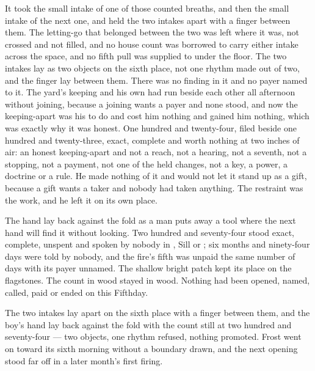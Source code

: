 It took the small intake of one of those counted breaths, and then the small intake of the next one, and held the two intakes apart with a finger between them. The letting-go that belonged between the two was left where it was, not crossed and not filled, and no house count was borrowed to carry either intake across the space, and no fifth pull was supplied to  under the floor. The two intakes lay as two objects on the sixth place, not one rhythm made out of two, and the finger lay between them. There was no finding in it and no payer named to it. The yard's keeping and his own had run beside each other all afternoon without joining, because a joining wants a payer and none stood, and now the keeping-apart was his to do and cost him nothing and gained him nothing, which was exactly why it was honest. One hundred and twenty-four, filed beside one hundred and twenty-three, exact, complete and worth nothing at two inches of air: an honest keeping-apart and not a reach, not a hearing, not a seventh, not a stopping, not a payment, not one of the held changes, not a key, a power, a doctrine or a rule. He made nothing of it and would not let it stand up as a gift, because a gift wants a taker and nobody had taken anything. The restraint was the work, and he left it on its own place.

The hand lay back against the fold as a man puts away a tool where the next hand will find it without looking. Two hundred and seventy-four stood exact, complete, unspent and spoken by nobody in , Sill or ; six months and ninety-four days were told by nobody, and the fire's fifth was unpaid the same number of days with its payer unnamed. The shallow bright patch kept its place on the flagstones. The count in wood stayed in wood. Nothing had been opened, named, called, paid or ended on this Fifthday.

The two intakes lay apart on the sixth place with a finger between them, and the boy's hand lay back against the fold with the count still at two hundred and seventy-four --- two objects, one rhythm refused, nothing promoted. Frost went on toward its sixth morning without a boundary drawn, and the next opening stood far off in a later month's first firing.
